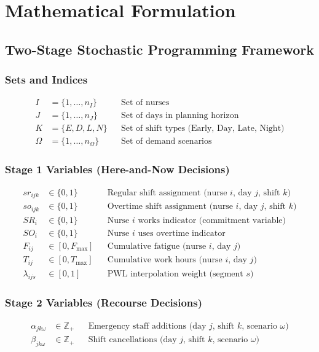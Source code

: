 \documentclass[11pt,letterpaper]{article}
\begin{document}
\section{Mathematical Formulation}

\subsection{Two-Stage Stochastic Programming Framework}

\subsubsection{Sets and Indices}
\begin{align*}
I &= \{1, \ldots, n_I\} && \text{Set of nurses} \\
J &= \{1, \ldots, n_J\} && \text{Set of days in planning horizon} \\
K &= \{E, D, L, N\} && \text{Set of shift types (Early, Day, Late, Night)} \\
\Omega &= \{1, \ldots, n_\Omega\} && \text{Set of demand scenarios}
\end{align*}

\subsubsection{Stage 1 Variables (Here-and-Now Decisions)}
\begin{align*}
sr_{ijk} &\in \{0, 1\} && \text{Regular shift assignment (nurse $i$, day $j$, shift $k$)} \\
so_{ijk} &\in \{0, 1\} && \text{Overtime shift assignment (nurse $i$, day $j$, shift $k$)} \\
SR_i &\in \{0, 1\} && \text{Nurse $i$ works indicator (commitment variable)} \\
SO_i &\in \{0, 1\} && \text{Nurse $i$ uses overtime indicator} \\
F_{ij} &\in [0, F_{\max}] && \text{Cumulative fatigue (nurse $i$, day $j$)} \\
T_{ij} &\in [0, T_{\max}] && \text{Cumulative work hours (nurse $i$, day $j$)} \\
\lambda_{ijs} &\in [0, 1] && \text{PWL interpolation weight (segment $s$)}
\end{align*}

\subsubsection{Stage 2 Variables (Recourse Decisions)}
\begin{align*}
\alpha_{jk\omega} &\in \mathbb{Z}_+ && \text{Emergency staff additions (day $j$, shift $k$, scenario $\omega$)} \\
\beta_{jk\omega} &\in \mathbb{Z}_+ && \text{Shift cancellations (day $j$, shift $k$, scenario $\omega$)}
\end{align*}
\end{document}
